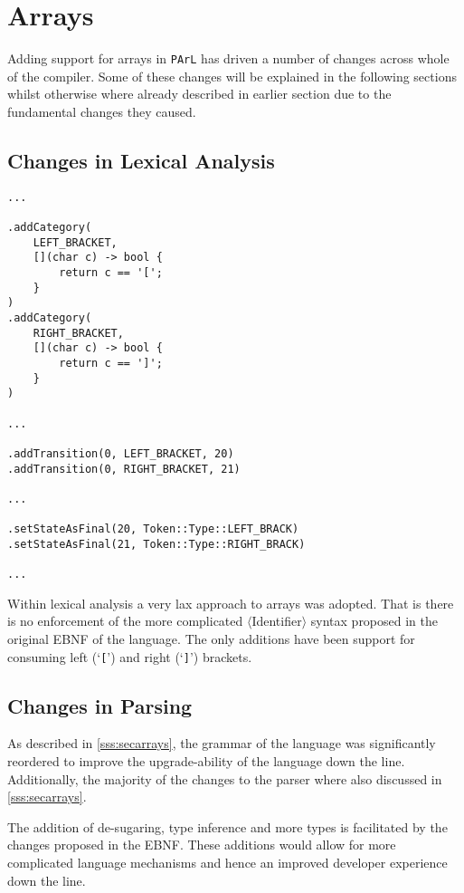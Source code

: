 \section{Arrays}

Adding support for arrays in \texttt{PArL} has driven a number
of changes across whole of the compiler. Some of these changes
will be explained in the following sections whilst otherwise
where already described in earlier section due to the
fundamental changes they caused.

\subsection{Changes in Lexical Analysis}

\begin{lstlisting}[caption={Changes in the
\texttt{LexerDirector} for supporting left (`\texttt{[}') and
right (`\texttt{]}') brackets (lexer/LexerDirector.cpp)}]
...

.addCategory(
    LEFT_BRACKET,
    [](char c) -> bool {
        return c == '[';
    }
)
.addCategory(
    RIGHT_BRACKET,
    [](char c) -> bool {
        return c == ']';
    }
)

...

.addTransition(0, LEFT_BRACKET, 20)
.addTransition(0, RIGHT_BRACKET, 21)

...

.setStateAsFinal(20, Token::Type::LEFT_BRACK)
.setStateAsFinal(21, Token::Type::RIGHT_BRACK)

...
\end{lstlisting}


Within lexical analysis a very lax approach to arrays was
adopted. That is there is no enforcement of the more complicated
$\langle$Identifier$\rangle$ syntax proposed in the original
EBNF of the language. The only additions have been support for
consuming left (`\texttt{[}') and right (`\texttt{]}') brackets.

\subsection{Changes in Parsing}

As described in \ref{sss:secarrays}, the grammar of the language
was significantly reordered to improve the upgrade-ability of
the language down the line. Additionally, the majority of the
changes to the parser where also discussed in
\ref{sss:secarrays}.

\begin{todo}
The addition of de-sugaring, type inference and more types is
facilitated by the changes proposed in the EBNF. These additions
would allow for more complicated language mechanisms and hence
an improved developer experience down the line.
\end{todo}

